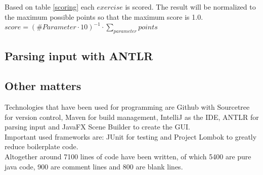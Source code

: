 \noindent Based on table \ref{scoring} each $exercise$ is scored.
The result will be normalized to the maximum possible points so that the maximum score is 1.0.\\
$score = (\#Parameter\cdot10)^{-1}\cdot\sum\limits_{parameter}^{}points$

\subsection{Parsing input with ANTLR}





\subsection{Other matters}

Technologies that have been used for programming are Github \cite{github} with Sourcetree \cite{sourcetree} for version control, Maven \cite{maven} for build management, IntelliJ\cite{intellij} as the IDE, ANTLR \cite{antlr} for parsing input and JavaFX Scene Builder \cite{scenebuilder} to create the GUI. \\

\noindent Important used frameworks are: JUnit \cite{junit} for testing and Project Lombok \cite{lombok} to greatly reduce boilerplate code.\\

\noindent Altogether around 7100 lines of code have been written, of which 5400 are pure java code, 900 are comment lines and 800 are blank lines.\\ 
\pagebreak